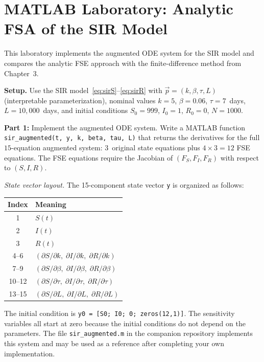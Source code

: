 \section{MATLAB Laboratory: Analytic FSA of the SIR Model}
\label{sec:ch4matlab}

This laboratory implements the augmented ODE system for the SIR model
and compares the analytic FSE approach with the finite-difference
method from Chapter~3.

\textbf{Setup.}
Use the SIR model~\eqref{eq:sirS}--\eqref{eq:sirR} with
\POIs $\vec{p} = (k, \beta, \tau, L)$ (interpretable parameterization),
nominal values $k = 5$, $\beta = 0.06$, $\tau = 7$~days, $L = 10{,}000$~days,
and initial conditions $S_0 = 999$, $I_0 = 1$, $R_0 = 0$, $N = 1000$.

\textbf{Part 1:} Implement the augmented ODE system.
Write a MATLAB function \texttt{sir\_augmented(t, y, k, beta, tau, L)}
that returns the derivatives for the full $15$-equation augmented system:
3~original state equations plus $4 \times 3 = 12$ FSE equations.
The FSE equations require the Jacobian of $(F_S, F_I, F_R)$ with
respect to $(S, I, R)$.

\medskip\noindent
\textit{State vector layout.} The 15-component state vector \texttt{y}
is organized as follows:
\begin{center}
\begin{tabular}{cl}
\toprule
Index & Meaning \\
\midrule
1 & $S(t)$ \\
2 & $I(t)$ \\
3 & $R(t)$ \\
4--6   & $(\partial S/\partial k,\; \partial I/\partial k,\; \partial R/\partial k)$ \\
7--9   & $(\partial S/\partial\beta,\; \partial I/\partial\beta,\; \partial R/\partial\beta)$ \\
10--12 & $(\partial S/\partial\tau,\; \partial I/\partial\tau,\; \partial R/\partial\tau)$ \\
13--15 & $(\partial S/\partial L,\; \partial I/\partial L,\; \partial R/\partial L)$ \\
\bottomrule
\end{tabular}
\end{center}
The initial condition is \texttt{y0 = [S0; I0; 0; zeros(12,1)]}.
The sensitivity variables all start at zero because the initial
conditions do not depend on the parameters.
The file \texttt{sir\_augmented.m} in the companion repository
implements this system and may be used as a reference after
completing your own implementation.

